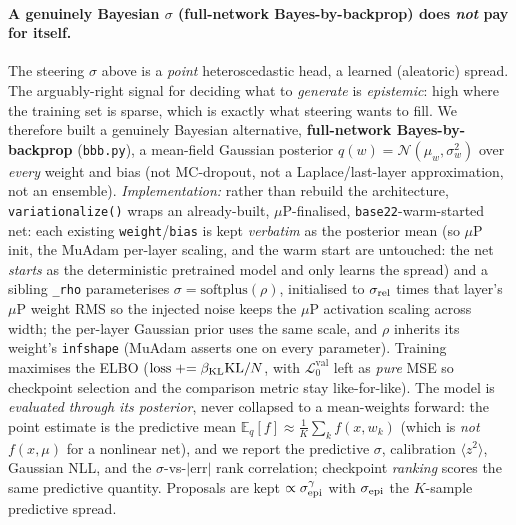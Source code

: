\documentclass[11pt]{article}
\newcommand{\vlnr}{\mathcal{L}^{\mathrm{val}}_{0}}   %
\newcommand{\code}[1]{\texttt{#1}}
\begin{document}
\paragraph{A genuinely Bayesian $\sigma$ (full-network Bayes-by-backprop) does \emph{not} pay for
itself.} The steering $\sigma$ above is a \emph{point} heteroscedastic head, a learned (aleatoric)
spread. The arguably-right signal for deciding what to \emph{generate} is \emph{epistemic}: high where
the training set is sparse, which is exactly what steering wants to fill. We therefore built a genuinely
Bayesian alternative, \textbf{full-network Bayes-by-backprop} (\code{bbb.py}), a mean-field Gaussian
posterior $q(w)=\mathcal N(\mu_w,\sigma_w^2)$ over \emph{every} weight and bias (not MC-dropout, not a
Laplace/last-layer approximation, not an ensemble). \emph{Implementation:} rather than rebuild the
architecture, \code{variationalize()} wraps an already-built, $\mu$P-finalised, \code{base22}-warm-started
net: each existing \code{weight}/\code{bias} is kept \emph{verbatim} as the posterior mean (so $\mu$P
init, the MuAdam per-layer scaling, and the warm start are untouched: the net \emph{starts} as the
deterministic pretrained model and only learns the spread) and a sibling \code{\_rho} parameterises
$\sigma=\mathrm{softplus}(\rho)$, initialised to $\sigma_{\rm rel}$ times that layer's $\mu$P weight RMS
so the injected noise keeps the $\mu$P activation scaling across width; the per-layer Gaussian prior uses
the same scale, and $\rho$ inherits its weight's \code{infshape} (MuAdam asserts one on every parameter).
Training maximises the ELBO ($\mathrm{loss}\mathrel{+}=\beta_{\rm KL}\mathrm{KL}/N$, with $\vlnr$ left as
\emph{pure} MSE so checkpoint selection and the comparison metric stay like-for-like). The model
is \emph{evaluated through its posterior}, never collapsed to a mean-weights forward: the point estimate is
the predictive mean $\mathbb E_q[f]\!\approx\!\tfrac1K\sum_k f(x,w_k)$ (which is \emph{not} $f(x,\mu)$ for a
nonlinear net), and we report the predictive $\sigma$, calibration $\langle z^2\rangle$, Gaussian NLL, and the
$\sigma$-vs-$|\mathrm{err}|$ rank correlation; checkpoint \emph{ranking} scores the same predictive quantity.
Proposals are kept $\propto\sigma_{\rm epi}^\gamma$ with $\sigma_{\rm epi}$ the $K$-sample predictive spread.
\end{document}
